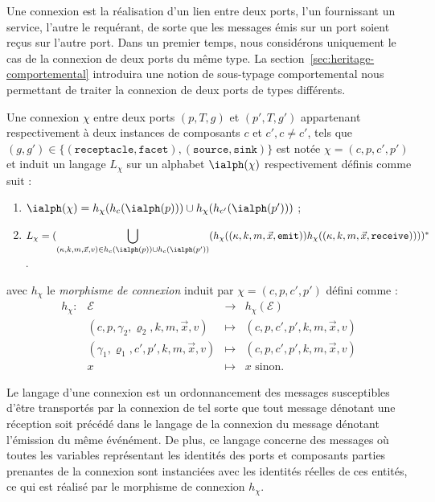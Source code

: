 Une connexion est la r\'ealisation d'un lien entre deux ports, l'un
fournissant un service, l'autre le requ\'erant, de sorte que les
messages \'emis sur un port soient re\c{c}us sur l'autre port. Dans un
premier temps, nous consid\'erons uniquement le cas de la connexion
de deux ports du m\^eme type. La
section~\ref{sec:heritage-comportemental} introduira une notion de
sous-typage comportemental nous permettant de traiter la connexion de
deux ports de types diff\'erents.

\begin{definition}[Connexion]
\label{def:connexions}
Une connexion $\chi$ entre deux ports $(p,T,g)$ et $(p',T,g')$ appartenant respectivement
\`a deux instances de composants $c$ et $c', c\neq c'$, tels que $(g,g') \in
\{(\mathtt{receptacle},\mathtt{facet}),(\mathtt{source},\mathtt{sink})\}$
est not\'ee $\chi = (c,p,c',p')$ et induit un langage $L_\chi$ sur un
alphabet $\ialph(\chi)$ respectivement d\'efinis
comme suit :
\begin{enumerate}
  \item $\ialph(\chi) = h_\chi(h_c(\ialph(p))) \cup h_\chi(h_{c'}(\ialph(p')))$ ;
  \item $L_\chi = ({\displaystyle \bigcup_{(\kappa,k,m,\vec{x},v)\in
  h_c(\ialph(p))\cup h_c(\ialph(p'))}}(h_\chi((\kappa,k,m,\vec{x},\mathtt{emit}))h_\chi((\kappa,k,m,\vec{x},\mathtt{receive}))))^*$. 
\end{enumerate}
    avec $h_\chi$ le \emph{morphisme de connexion} induit par $\chi=(c,p,c',p')$
    d\'efini comme :
$$\begin{array}{rlcl}
h_\chi:&\mathcal{E} &\longrightarrow& h_\chi(\mathcal{E})\\
&(c,p,\gamma_2,\varrho_2,k,m,\vec{x},v)&\longmapsto&(c,p,c',p',k,m,\vec{x},v)
\\
&(\gamma_1,\varrho_1,c',p',k,m,\vec{x},v)&\longmapsto&(c,p,c',p',k,m,\vec{x},v)
\\
&x&\longmapsto&x\mbox{~sinon.}
\end{array}$$
\end{definition}

Le langage d'une connexion est  un ordonnancement des
messages susceptibles d'\^etre transport\'es par la connexion de tel
sorte que tout message d\'enotant une r\'eception soit
pr\'ec\'ed\'e dans le langage de la connexion du
message d\'enotant l'\'emission du m\^eme \'ev\'en\'ement. De
plus, ce langage concerne des messages o\`u toutes les variables
repr\'esentant les identit\'es des ports et composants parties
prenantes de la connexion sont instanci\'ees avec les identit\'es
r\'eelles de ces entit\'es, ce qui est r\'ealis\'e par le
morphisme de connexion $h_\chi$. 

